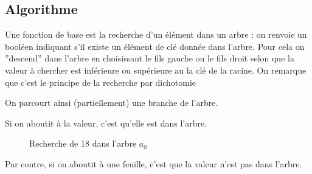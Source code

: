 \subsection{Algorithme}
Une fonction de base est la recherche d'un élément dans un arbre : on renvoie un booléen indiquant s'il existe un élément de clé donnée dans l'arbre. Pour cela on ''descend'' dans l'arbre en choisissant le fils gauche ou le fils droit selon que la valeur à chercher est inférieure ou supérieure au la clé de la racine. On remarque que c'est le principe de la recherche par dichotomie

On parcourt ainsi (partiellement) une branche de l'arbre.

\medskip

Si on aboutit à la valeur, c'est qu'elle est dans l'arbre. 

\begin{figure*}[h]
\centering
{}
\caption{Recherche de 18 dans l'arbre $a_0$}
\end{figure*}

Par contre, si on aboutit à une feuille, c'est que la valeur n'est pas dans l'arbre. 

